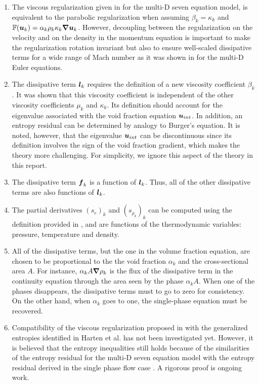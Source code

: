 \begin{enumerate}
\item {The viscous regularization given in  for the multi-D seven equation model, is equivalent to the parabolic regularization \cite{Parabolic} when assuming $\beta_k = \kappa_k$ and $\mathbb{F}(\boldsymbol u_k) = \alpha_k \rho_k \kappa_k \boldsymbol{\nabla} \boldsymbol u_k$. However, decoupling between the regularization on the velocity and on the density in the momentum equation is important to make the regularization rotation invariant but also to ensure well-scaled dissipative terms for a wide range of Mach number as it was shown in  for the multi-D Euler equations.}
\item {The dissipative term $\boldsymbol l_k$ requires the definition of a new viscosity
    coefficient $\beta_k$. It was shown that this viscosity coefficient is independent of
    the other viscosity coefficients $\mu_k$ and $\kappa_k$. Its definition should
    account for the eigenvalue associated with the void fraction equation $\boldsymbol u_{int}$.
    In addition, an entropy residual can be determined by analogy to Burger's
    equation. It is noted, however, that the eigenvalue $\boldsymbol u_{int}$ can be discontinuous
    since its definition involves the sign of the void fraction gradient, which
    makes the theory more challenging. For simplicity, we ignore this aspect of the
    theory in this report.}

\item {The dissipative term $\boldsymbol f_k$ is a function of $\boldsymbol l_k$. Thus, all of the other
    dissipative terms are also functions of $\boldsymbol l_k$.}

\item {The partial derivatives $(s_e)_k$ and $(s_{\rho_k})_k$ can be computed using the
    definition provided in , and are functions of the thermodynamic
    variables: pressure, temperature and density.}

\item {All of the dissipative terms, but the one in the volume fraction equation, are chosen to be proportional to the the void
    fraction $\alpha_k$ and the cross-sectional area $A$. For instance, $\alpha_k A \boldsymbol{\nabla} \rho_k$ is the
    flux of the dissipative term in the continuity equation through the area seen
    by the phase $\alpha_k A$. When one of the phases disappears, the dissipative terms
    must to go to zero for consistency. On the other hand, when $\alpha_k$ goes to one,
    the single-phase equation must be recovered. }
    
\item{Compatibility of the viscous regularization proposed in  with the generalized entropies identified in Harten et al. \cite{Harten} has not been investigated yet. However, it is believed that the entropy inequalities still holds because of the similarities of the entropy residual for the multi-D seven equation model with the entropy residual derived in the single phase flow case \cite{jlg}. A rigorous proof is ongoing work.}
\end{enumerate}
